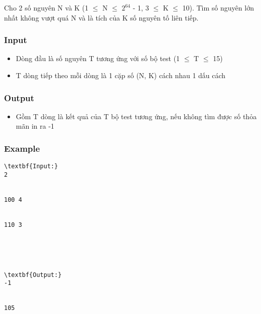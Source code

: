 



   Cho 2 số nguyên N và K (1  $\le$  N  $\le$  $2^{64}$   - 1, 3  $\le$  K  $\le$  10). Tìm số nguyên lớn nhất không vượt quá N và là tích của K số nguyên tố liên tiếp.  

\subsubsection{   Input  }
\begin{itemize}
	\item     Dòng đầu là số nguyên T tương ứng với số bộ test (1  $\le$  T  $\le$  15)   
	\item     T dòng tiếp theo mỗi dòng là 1 cặp số (N, K) cách nhau 1 dấu cách   
\end{itemize}

\subsubsection{   Output  }
\begin{itemize}
	\item     Gồm T dòng là kết quả của T bộ test tương ứng, nếu không tìm được số thỏa mãn in ra -1   
\end{itemize}

\subsubsection{   Example  }
\begin{verbatim}
\textbf{Input:}
2


100 4


110 3





\textbf{Output:}
-1


105 \end{verbatim}
